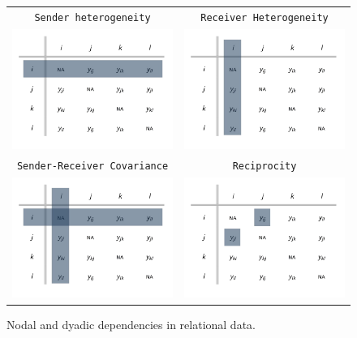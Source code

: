 \begin{figure}
	\begin{tabular}{cc}
		\texttt{Sender heterogeneity} & \texttt{Receiver Heterogeneity} \\
		\includegraphics[width=.4\textwidth]{adjRowDep.png} & \includegraphics[width=.4\textwidth]{adjColDep.png} \\
		\texttt{Sender-Receiver Covariance} & \texttt{Reciprocity} \\
		\includegraphics[width=.4\textwidth]{adjRowColCovar.png} & \includegraphics[width=.4\textwidth]{adjRecip.png} \\
	\end{tabular}
	\caption{Nodal and dyadic dependencies in relational data.}
	\label{fig:adjMatDeps}
\end{figure}

